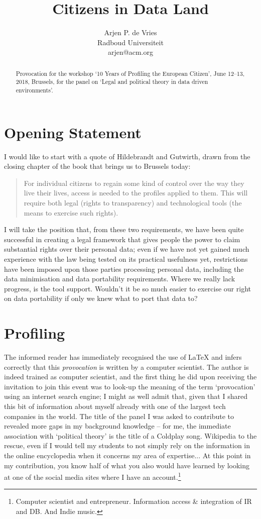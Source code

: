 \documentclass[a4paper,twoside,12pt]{article}
\title{Citizens in Data Land}
\author{Arjen P. de Vries\\Radboud Universiteit\\arjen@acm.org}
\date{}
\begin{document}
\maketitle

\begin{abstract}
Provocation for the workshop `10 Years of Profiling the European Citizen', June 12--13, 2018, Brussels, for the panel on `Legal and political theory in data driven environments'.
\end{abstract}

\section*{Opening Statement}
I would like to start with a quote of Hildebrandt and Gutwirth, drawn from the closing chapter of the book that brings us to Brussels today:
\begin{quote}
For individual citizens to regain some kind of control over the way they live their lives, access is
needed to the profiles applied to them. This will require both legal (rights to transparency)
and technological tools (the means to exercise such rights).
\end{quote}

I will take the position that, from these two requirements, we have been quite successful in creating a legal framework that gives people the power to claim substantial rights over their personal data; even if we have not yet gained much experience with the law being tested on its practical usefulness yet, restrictions have been imposed upon those parties processing personal data, including the data minimisation and data portability requirements. Where we really lack progress, is the tool support. Wouldn't it be so much easier to exercise our right on data portability if only we knew what to port that data to? 

\section*{Profiling}
The informed reader has immediately recognised the use of \LaTeX{} and infers correctly that this \emph{provocation} is written by a computer scientist. The author is indeed trained as computer scientist, and the first thing he did upon receiving the invitation to join this event was to look-up the meaning of the term `provocation' using an internet search engine; I might as well admit that, given that I shared this bit of information about myself already with one of the largest tech companies in the world. The title of the panel I was asked to contribute to revealed more gaps in my background knowledge -- for me, the immediate association with `political theory' is the title of a Coldplay song. Wikipedia to the rescue, even if I would tell my students to not simply rely on the information in the online encyclopedia when it concerns my area of expertise... At this point in my contribution, you know half of what you also would have learned by looking at one of the social media sites where I have an account.\footnote{%
Computer scientist and entrepreneur. Information access \& integration of IR and DB. And Indie music.}
\end{document}
